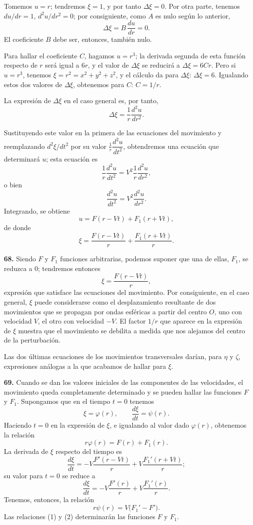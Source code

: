 Tomemos $u=r$; tendremos $\xi=1$, y por tanto $\Delta\xi=0$. Por otra
parte, tenemos $du/dr=1$, $d^2u/dr^2=0$; por consiguiente, como $A$ es nulo
según lo anterior,
\[
\Delta\xi = B\,\frac{du}{dr} = 0.
\]
El coeficiente $B$ debe ser, entonces, también nulo.

Para hallar el coeficiente $C$, hagamos $u=r^3$; la derivada segunda de
esta función respecto de $r$ será igual a $6r$, y el valor de $\Delta\xi$
se reducirá a $\Delta\xi=6Cr$. Pero si $u=r^3$, tenemos
$\xi=r^2=x^2+y^2+z^2$, y el cálculo da para $\Delta\xi$: $\Delta\xi=6$.
Igualando estos dos valores de $\Delta\xi$, obtenemos para $C$:
$C=1/r$.

La expresión de $\Delta\xi$ en el caso general es, por tanto,
\[
\Delta\xi = \frac{1}{r}\frac{d^2u}{dr^2}.
\]

Sustituyendo este valor en la primera de las ecuaciones del movimiento y
reemplazando $d^2\xi/dt^2$ por su valor $\frac{1}{r}\dfrac{d^2u}{dt^2}$,
obtendremos una ecuación que determinará $u$; esta ecuación es
\[
\frac{1}{r}\frac{d^2u}{dt^2} = V^2\frac{1}{r}\frac{d^2u}{dr^2},
\]
o bien
\[
\frac{d^2u}{dt^2} = V^2\frac{d^2u}{dr^2}.
\]
Integrando, se obtiene
\[
u = F(r-Vt) + F_1(r+Vt),
\]
de donde
\[
\xi = \frac{F(r-Vt)}{r} + \frac{F_1(r+Vt)}{r}.
\]

\noindent\textbf{68.} Siendo $F$ y $F_1$ funciones arbitrarias, podemos
suponer que una de ellas, $F_1$, se reduzca a $0$; tendremos entonces
\[
\xi = \frac{F(r-Vt)}{r},
\]
expresión que satisface las ecuaciones del movimiento. Por consiguiente, en
el caso general, $\xi$ puede considerarse como el desplazamiento resultante
de dos movimientos que se propagan por ondas esféricas a partir del centro
$O$, uno con velocidad $V$, el otro con velocidad $-V$. El factor $1/r$ que
aparece en la expresión de $\xi$ muestra que el movimiento se debilita a
medida que nos alejamos del centro de la perturbación.

Las dos últimas ecuaciones de los movimientos transversales darían, para
$\eta$ y $\zeta$, expresiones análogas a la que acabamos de hallar para
$\xi$.

\noindent\textbf{69.} Cuando se dan los valores iniciales de las
componentes de las velocidades, el movimiento queda completamente
determinado y se pueden hallar las funciones $F$ y $F_1$. Supongamos que en
el tiempo $t=0$ tenemos
\[
\xi=\varphi(r),\qquad \frac{d\xi}{dt}=\psi(r).
\]
Haciendo $t=0$ en la expresión de $\xi$, e igualando al valor dado
$\varphi(r)$, obtenemos la relación
\[
r\varphi(r) = F(r) + F_1(r). \tag{1}
\]
La derivada de $\xi$ respecto del tiempo es
\[
\frac{d\xi}{dt} = -V\frac{F'(r-Vt)}{r} + V\frac{F_1'(r+Vt)}{r};
\]
su valor para $t=0$ se reduce a
\[
\frac{d\xi}{dt} = -V\frac{F'(r)}{r} + V\frac{F_1'(r)}{r}.
\]
Tenemos, entonces, la relación
\[
r\psi(r) = V\bigl(F_1'-F'\bigr). \tag{2}
\]
Las relaciones (1) y (2) determinarán las funciones $F$ y $F_1$.

